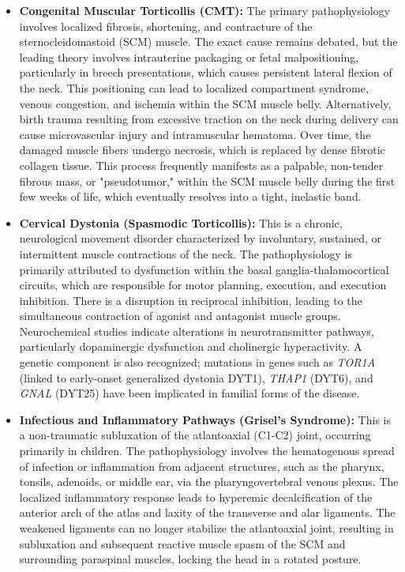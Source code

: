 \begin{itemize}
    \item \textbf{Congenital Muscular Torticollis (CMT):} The primary pathophysiology involves localized fibrosis, shortening, and contracture of the sternocleidomastoid (SCM) muscle. The exact cause remains debated, but the leading theory involves intrauterine packaging or fetal malpositioning, particularly in breech presentations, which causes persistent lateral flexion of the neck. This positioning can lead to localized compartment syndrome, venous congestion, and ischemia within the SCM muscle belly. Alternatively, birth trauma resulting from excessive traction on the neck during delivery can cause microvascular injury and intramuscular hematoma. Over time, the damaged muscle fibers undergo necrosis, which is replaced by dense fibrotic collagen tissue. This process frequently manifests as a palpable, non-tender fibrous mass, or "pseudotumor," within the SCM muscle belly during the first few weeks of life, which eventually resolves into a tight, inelastic band.
    \item \textbf{Cervical Dystonia (Spasmodic Torticollis):} This is a chronic, neurological movement disorder characterized by involuntary, sustained, or intermittent muscle contractions of the neck. The pathophysiology is primarily attributed to dysfunction within the basal ganglia-thalamocortical circuits, which are responsible for motor planning, execution, and execution inhibition. There is a disruption in reciprocal inhibition, leading to the simultaneous contraction of agonist and antagonist muscle groups. Neurochemical studies indicate alterations in neurotransmitter pathways, particularly dopaminergic dysfunction and cholinergic hyperactivity. A genetic component is also recognized; mutations in genes such as \textit{TOR1A} (linked to early-onset generalized dystonia DYT1), \textit{THAP1} (DYT6), and \textit{GNAL} (DYT25) have been implicated in familial forms of the disease.
    \item \textbf{Infectious and Inflammatory Pathways (Grisel's Syndrome):} This is a non-traumatic subluxation of the atlantoaxial (C1-C2) joint, occurring primarily in children. The pathophysiology involves the hematogenous spread of infection or inflammation from adjacent structures, such as the pharynx, tonsils, adenoids, or middle ear, via the pharyngovertebral venous plexus. The localized inflammatory response leads to hyperemic decalcification of the anterior arch of the atlas and laxity of the transverse and alar ligaments. The weakened ligaments can no longer stabilize the atlantoaxial joint, resulting in subluxation and subsequent reactive muscle spasm of the SCM and surrounding paraspinal muscles, locking the head in a rotated posture.

\end{itemize}
